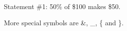 \documentclass{article}
\begin{document}
Statement \#1:
50\% of \$100 makes \$50.

More special symbols are \&, \_, \{ and \}.
\end{document}
